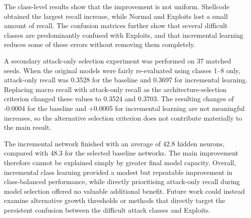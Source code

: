 \documentclass[conference]{IEEEtran}
\begin{document}
The class-level results show that the improvement is not uniform. Shellcode obtained the largest recall increase, while Normal and Exploits lost a small amount of recall. The confusion matrices further show that several difficult classes are predominantly confused with Exploits, and that incremental learning reduces some of these errors without removing them completely.

A secondary attack-only selection experiment was performed on 37 matched seeds. When the original models were fairly re-evaluated using classes 1--8 only, attack-only recall was 0.3528 for the baseline and 0.3697 for incremental learning. Replacing macro recall with attack-only recall as the architecture-selection criterion changed these values to 0.3524 and 0.3703. The resulting changes of -0.0004 for the baseline and +0.0005 for incremental learning are not meaningful increases, so the alternative selection criterion does not contribute materially to the main result.

The incremental network finished with an average of 42.8 hidden neurons, compared with 48.3 for the selected baseline networks. The main improvement therefore cannot be explained simply by greater final model capacity. Overall, incremental class learning provided a modest but repeatable improvement in class-balanced performance, while directly prioritising attack-only recall during model selection offered no valuable additional benefit. Future work could instead examine alternative growth thresholds or methods that directly target the persistent confusion between the difficult attack classes and Exploits.
\end{document}
